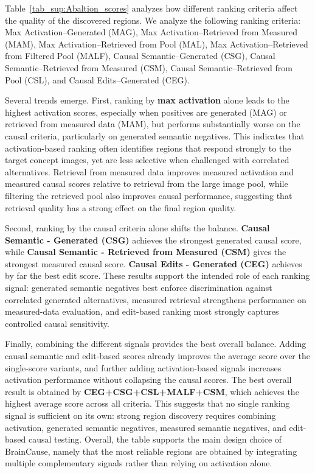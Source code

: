 \documentclass{llmxive}
\begin{document}
Table~\ref{tab_sup:Abaltion_scores} analyzes how different ranking criteria affect the quality of the discovered regions. We analyze the following ranking criteria: Max Activation–Generated (MAG), Max Activation–Retrieved from Measured (MAM), Max Activation–Retrieved from Pool (MAL), Max Activation–Retrieved from Filtered Pool (MALF), Causal Semantic–Generated (CSG), Causal Semantic–Retrieved from Measured (CSM), Causal Semantic–Retrieved from Pool (CSL), and Causal Edits–Generated (CEG).

Several trends emerge. First, ranking by \textbf{max activation} alone leads to the highest activation scores, especially when positives are generated (MAG) or retrieved from measured data (MAM), but performs substantially worse on the causal criteria, particularly on generated semantic negatives. This indicates that activation-based ranking often identifies regions that respond strongly to the target concept images, yet are less selective when challenged with correlated alternatives. Retrieval from measured data improves measured activation and measured causal scores relative to retrieval from the large image pool, while filtering the retrieved pool also improves causal performance, suggesting that retrieval quality has a strong effect on the final region quality.

Second, ranking by the causal criteria alone shifts the balance. \textbf{Causal Semantic - Generated (CSG)} achieves the strongest generated causal score, while \textbf{Causal Semantic - Retrieved from Measured (CSM)} gives the strongest measured causal score. \textbf{Causal Edits - Generated (CEG)} achieves by far the best edit score. These results support the intended role of each ranking signal: generated semantic negatives best enforce discrimination against correlated generated alternatives, measured retrieval strengthens performance on measured-data evaluation, and edit-based ranking most strongly captures controlled causal sensitivity.

Finally, combining the different signals provides the best overall balance. Adding causal semantic and edit-based scores already improves the average score over the single-score variants, and further adding activation-based signals increases activation performance without collapsing the causal scores. The best overall result is obtained by \textbf{CEG+CSG+CSL+MALF+CSM}, which achieves the highest average score across all criteria. This suggests that no single ranking signal is sufficient on its own: strong region discovery requires combining activation, generated semantic negatives, measured semantic negatives, and edit-based causal testing. Overall, the table supports the main design choice of BrainCause, namely that the most reliable regions are obtained by integrating multiple complementary signals rather than relying on activation alone.
\end{document}
